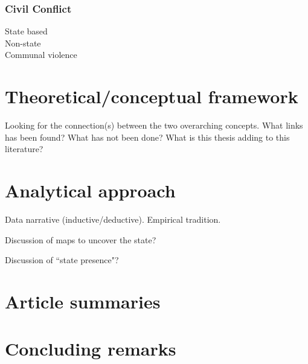 \documentclass[12pt]{article}
\begin{document}
\subsubsection{Civil Conflict} \label{Civil Conflict}

State based \\

Non-state \\ 

Communal violence \\

\section{Theoretical/conceptual framework} \label{Theoretical/conceptual framework}

Looking for the connection(s) between the two overarching concepts. What links
has been found? What has not been done? What is this thesis adding to this
literature?

\section{Analytical approach} \label{Analytical approach}

Data narrative (inductive/deductive). Empirical tradition.

Discussion of maps to uncover the state?

Discussion of ``state presence"?

\section{Article summaries} \label{Article summaries}

\section{Concluding remarks} \label{Concluding remarks}

\pagebreak



\end{document}
